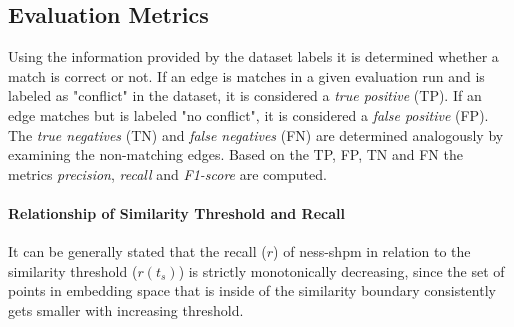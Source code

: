 \documentclass[11pt]{scrreprt}
\begin{document}
{\subsection{Evaluation Metrics}
\label{sec:evaluation-metrics}
Using the information provided by the dataset labels it is determined whether a match is correct or not. If an edge is matches in a given evaluation run and is labeled as "conflict" in the dataset, it is considered a \textit{true positive} (TP). If an edge matches but is labeled "no conflict", it is considered a \textit{false positive} (FP). The \textit{true negatives} (TN) and \textit{false negatives} (FN) are determined analogously  by examining the non-matching edges. Based on the TP, FP, TN and FN the metrics \textit{precision}, \textit{recall} and \textit{F1-score} are computed.

\paragraph{Relationship of Similarity Threshold and Recall}
It can be generally stated that the recall (\(r\)) of \gls{ness-shpm} in relation to the similarity threshold (\(r(t_s)\)) is strictly monotonically decreasing, since the set of points in embedding space that is inside of the similarity boundary consistently gets smaller with increasing threshold.



}
\end{document}
